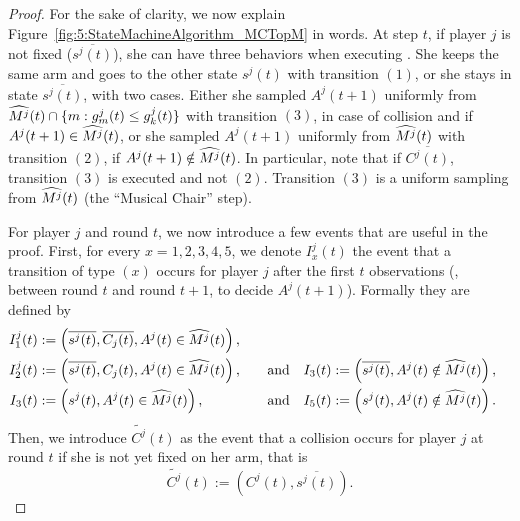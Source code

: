 \begin{proof}
  For the sake of clarity, we now explain Figure~\ref{fig:5:StateMachineAlgorithm_MCTopM} in words. At step $t$, if player $j$ is not fixed ($\overline{s^j(t)}$), she can have three behaviors when executing \MCTopM.
  She keeps the same arm and goes to the other state $s^j(t)$ with transition $(1)$,
  or she stays in state $\overline{s^j(t)}$,
  with two cases.
  Either she sampled $A^j(t+1)$ uniformly
  from $\widehat{M^j}(t) \cap \{ m : g_m^j(t) \leq g_k^j(t) \}$
  with transition $(3)$,
  in case of collision and if $A^j(t+1) \in \widehat{M^j}(t)$,
  or she sampled $A^j(t+1)$ uniformly
  from $\widehat{M^j}(t)$ with transition $(2)$,
  if $A^j(t+1) \notin \widehat{M^j}(t)$.
  In particular, note that if $\overline{C^j(t)}$, transition $(3)$ is executed and not $(2)$.
  Transition $(3)$ is a uniform sampling from $\widehat{M^j}(t)$ (the ``Musical Chair'' step).


  For player $j$ and round $t$, we now introduce a few events that are useful in the proof. First, for every $x=1,2,3,4,5$, we denote $I_x^j(t)$ the event that a transition of type $(x)$ occurs for player $j$ after the first $t$ observations (\ie, between round $t$ and round $t+1$, to decide $A^j(t+1)$).
  Formally they are defined by
  \begin{align*}
    I_1^j(t) &:= \left(\overline{s^j(t)},\overline{C_j(t)}, A^j(t) \in \widehat{M^j}(t)\right), \\
    I_2^j(t) &:= \left(\overline{s^j(t)},C_j(t), A^j(t) \in \widehat{M^j}(t)\right),
    \ \ \ &\text{and} \ \ \
    I_3(t) &:= \left(\overline{s^j(t)},A^j(t) \notin \widehat{M^j}(t)\right), \\
    I_3(t) &:= \left(s^j(t),A^j(t) \in \widehat{M^j}(t)\right),
    \ \ \ &\text{and} \ \ \
    I_5(t) &:= \left(s^j(t),A^j(t) \notin \widehat{M^j}(t)\right).
  \end{align*}
  Then, we introduce $\widetilde{C^j}(t)$ as the event that a collision occurs for player $j$ at round $t$ if she is not yet fixed on her arm, that is
  \begin{equation}
      \widetilde{C^j}(t) := \left(C^j(t), \overline{s^j(t)}\right).
  \end{equation}



\end{proof}
